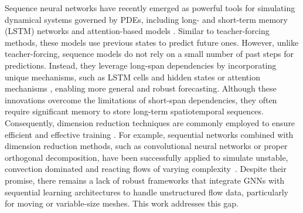 \documentclass{article}
\begin{document}
Sequence neural networks have recently emerged as powerful tools for simulating dynamical systems governed by PDEs, including long- and short-term memory (LSTM) networks \cite{vlachas2018data,ren2022phycrnet} and attention-based models \cite{geneva2022transformers}. Similar to teacher-forcing methods, these models use previous states to predict future ones. However, unlike teacher-forcing, sequence models do not rely on a small number of past steps for predictions. Instead, they leverage long-span dependencies by incorporating unique mechanisms, such as LSTM cells and hidden states \cite{hochreiter1997long} or attention mechanisms \cite{vaswani2017attention}, enabling more general and robust forecasting. Although these innovations overcome the limitations of short-span dependencies, they often require significant memory to store long-term spatiotemporal sequences. Consequently, dimension reduction techniques are commonly employed to ensure efficient and effective training \cite{lusch2018deep,pawar2019deep,lee2020model,hasegawa2020machine,murata2020nonlinear,eivazi2021recurrent,jacquier2021non,morimoto2021convolutional,fresca2022pod,vlachas2022multiscale}. For example, sequential networks combined with dimension reduction methods, such as convolutional neural networks or proper orthogonal decomposition, have been successfully applied to simulate unstable, convection dominated and reacting flows of varying complexity~\cite{wu2020data,ren2022phycrnet,geneva2022transformers,eivazi2020deep,maulik2021reduced,peng2020unsteady,xu2020multi}. Despite their promise, there remains a lack of robust frameworks that integrate GNNs with sequential learning architectures to handle unstructured flow data, particularly for moving or variable-size meshes. This work addresses this gap.
\end{document}
